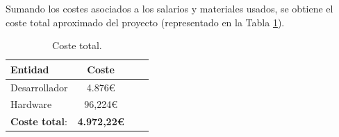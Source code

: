 Sumando los costes asociados a los salarios y materiales usados, se obtiene el coste total aproximado del proyecto (representado en la Tabla \ref{tab:coste-total}).

\begin{table}[H]
    \begin{center}
    \begin{tabular}{| l | c | c | c |}
        \hline
        \textbf{Entidad} & \textbf{Coste } \\ \hline
        Desarrollador & 4.876\euro \\
        Hardware & 96,224\euro \\ \hline
        \textbf{Coste total}: & \textbf{4.972,22\euro} \\ \hline
    \end{tabular}
    \caption{Coste total.}
    \label{tab:coste-total}
    \end{center}
\end{table} 